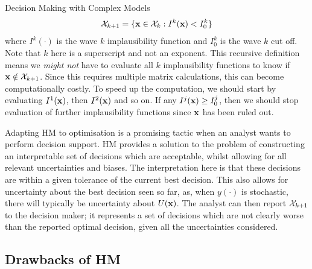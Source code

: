 \begin{chapter}{Decision Making with Complex Models \label{Chap:optimisation}}
\begin{equation}
 \mathcal{X}_{k+1} = \{ \mathbf{x} \in \mathcal{X}_k : I^{k}(\mathbf{x}) < I^k_0 \}
\end{equation}
where $I^k(\cdot)$ is the wave $k$ implausibility function and $I^k_0$ is the wave $k$ cut off. Note that $k$ here is a superscript and not an exponent. This recursive definition means we \textit{might not} have to evaluate all $k$ implausibility functions to know if $\mathbf{x} \notin \mathcal{X}_{k+1}$. Since this requires multiple matrix calculations, this can become computationally costly. To speed up the computation, we should start by evaluating $I^1(\mathbf{x})$, then $I^2(\mathbf{x})$ and so on. If any $I^j(\mathbf{x}) \geq I^j_0$, then we should stop evaluation of further implausibility functions since $\mathbf{x}$ has been ruled out.

Adapting HM to optimisation is a promising tactic when an analyst wants to perform decision support. HM provides a solution to the problem of constructing an interpretable set of decisions which are acceptable, whilst allowing for all relevant uncertainties and biases. The interpretation here is that these decisions are within a given tolerance of the current best decision. This also allows for uncertainty about the best decision seen so far, as, when $y(\cdot)$ is stochastic, there will typically be uncertainty about $U(\mathbf{x})$. The analyst can then report $\mathcal{X}_{k+1}$ to the decision maker; it represents a set of decisions which are not clearly worse than the reported optimal decision, given all the uncertainties considered.
\subsection{Drawbacks of HM}




\end{chapter}
